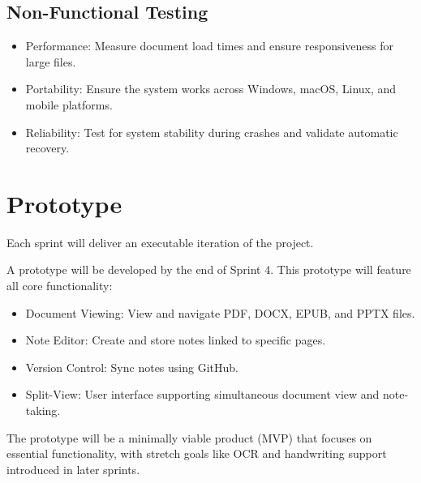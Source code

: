 \subsection{Non-Functional Testing}
\begin{itemize}
    \item Performance: Measure document load times and ensure responsiveness for large files.
    \item Portability: Ensure the system works across Windows, macOS, Linux, and mobile platforms.
    \item Reliability: Test for system stability during crashes and validate automatic recovery.
\end{itemize}

\section{Prototype}
Each sprint will deliver an executable iteration of the project. 

A prototype will be developed by the end of Sprint 4. This prototype will feature all core functionality:
\begin{itemize}
    \item Document Viewing: View and navigate PDF, DOCX, EPUB, and PPTX files.
    \item Note Editor: Create and store notes linked to specific pages.
    \item Version Control: Sync notes using GitHub.
    \item Split-View: User interface supporting simultaneous document view and note-taking.
\end{itemize}

The prototype will be a minimally viable product (MVP) that focuses on essential functionality, with stretch goals like OCR and handwriting support introduced in later sprints.

